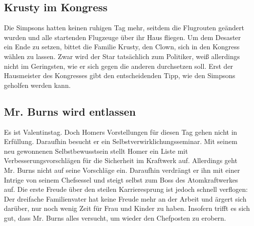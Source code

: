

\subsection{Krusty im Kongress}\label{EABF09}
Die Simpsons hatten keinen ruhigen Tag mehr, seitdem die Flugrouten geändert wurden und alle startenden Flugzeuge über ihr Haus fliegen. Um dem Desaster ein Ende zu setzen, bittet die Familie Krusty, den Clown, sich in den Kongress wählen zu lassen. Zwar wird der Star tatsächlich zum Politiker, weiß allerdings nicht im Geringsten, wie er sich gegen die anderen durchsetzen soll. Erst der Hausmeister des Kongresses gibt den entscheidenden Tipp, wie den Simpsons geholfen werden kann.


\subsection{Mr. Burns wird entlassen}\label{EABF10}
Es ist Valentinstag. Doch Homers Vorstellungen für diesen Tag gehen nicht in Erfüllung. Daraufhin besucht er ein Selbstverwirklichungsseminar. Mit seinem neu gewonnenen Selbstbewusstsein stellt Homer ein Liste mit Verbesserungsvorschlägen für die Sicherheit im Kraftwerk auf. Allerdings geht Mr. Burns nicht auf seine Vorschläge ein. Daraufhin verdrängt er ihn mit einer Intrige von seinem Chefsessel und steigt selbst zum Boss des Atomkraftwerkes auf. Die erste Freude über den steilen Karrieresprung ist jedoch schnell verflogen: Der dreifache Familienvater hat keine Freude mehr an der Arbeit und ärgert sich darüber, nur noch wenig Zeit für Frau und Kinder zu haben. Insofern trifft es sich gut, dass Mr. Burns alles versucht, um wieder den Chefposten zu erobern.


